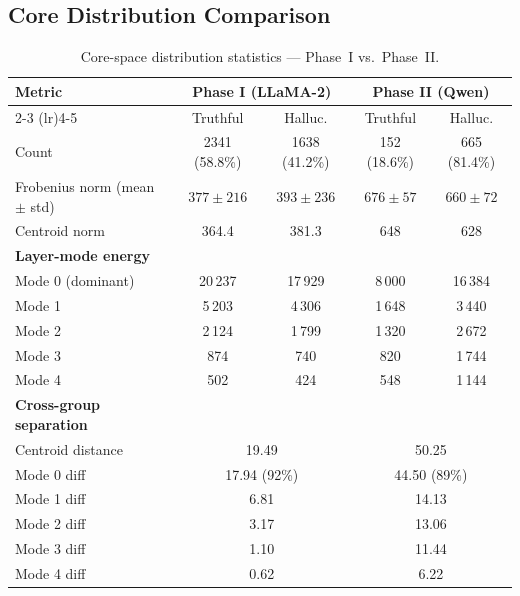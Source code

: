 \documentclass[11pt,a4paper]{article}
\begin{document}
\subsection{Core Distribution Comparison}

\begin{table}[H]
\centering
\begin{tabular}{lcccc}
\toprule
\textbf{Metric} & \multicolumn{2}{c}{\textbf{Phase I (LLaMA-2)}} & \multicolumn{2}{c}{\textbf{Phase II (Qwen)}} \\
\cmidrule(lr){2-3} \cmidrule(lr){4-5}
& Truthful & Halluc. & Truthful & Halluc. \\
\midrule
Count                          & 2341 (58.8\%) & 1638 (41.2\%) & 152 (18.6\%) & 665 (81.4\%) \\
Frobenius norm  (mean $\pm$ std) & $377 \pm 216$  & $393 \pm 236$  & $676 \pm 57$  & $660 \pm 72$ \\
Centroid norm                  & 364.4 & 381.3 & 648 & 628 \\
\addlinespace
\textbf{Layer-mode energy}     &        &        &        & \\
\quad Mode 0 (dominant)        & 20\,237 & 17\,929 & 8\,000 & 16\,384 \\
\quad Mode 1                   & 5\,203  & 4\,306  & 1\,648 & 3\,440 \\
\quad Mode 2                   & 2\,124  & 1\,799  & 1\,320 & 2\,672 \\
\quad Mode 3                   & 874     & 740     & 820   & 1\,744 \\
\quad Mode 4                   & 502     & 424     & 548   & 1\,144 \\
\addlinespace
\textbf{Cross-group separation}&        &        &        & \\
\quad Centroid distance        & \multicolumn{2}{c}{19.49} & \multicolumn{2}{c}{50.25} \\
\quad Mode 0 diff              & \multicolumn{2}{c}{17.94 (92\%)} & \multicolumn{2}{c}{44.50 (89\%)} \\
\quad Mode 1 diff              & \multicolumn{2}{c}{6.81}  & \multicolumn{2}{c}{14.13} \\
\quad Mode 2 diff              & \multicolumn{2}{c}{3.17}  & \multicolumn{2}{c}{13.06} \\
\quad Mode 3 diff              & \multicolumn{2}{c}{1.10}  & \multicolumn{2}{c}{11.44} \\
\quad Mode 4 diff              & \multicolumn{2}{c}{0.62}  & \multicolumn{2}{c}{6.22} \\
\bottomrule
\end{tabular}
\caption{Core-space distribution statistics — Phase~I vs.\ Phase~II.}
\end{table}
\end{document}
